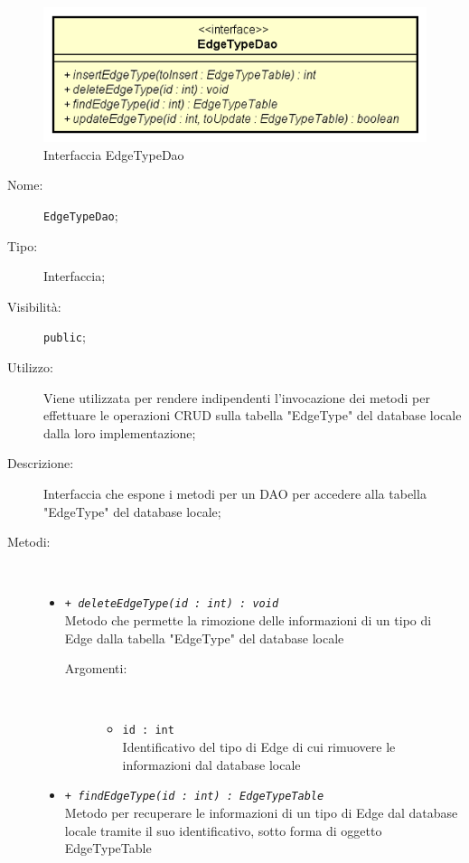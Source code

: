 \documentclass[../DefinizioneDiProdotto.tex]{subfiles}
\begin{document}
    \begin{figure}[H]
        \centering
        \includegraphics{img/EdgeTypeDao.png}
        \caption{Interfaccia EdgeTypeDao}\label{fig:model::dataaccess::dao::EdgeTypeDao} 
    \end{figure}
    \begin{description}
\item[Nome:] \texttt{EdgeTypeDao};
\item[Tipo:] Interfaccia;
\item[Visibilità:] \texttt{public};
\item[Utilizzo:] Viene utilizzata per rendere indipendenti l'invocazione dei metodi per effettuare le operazioni CRUD sulla tabella "EdgeType" del database locale dalla loro implementazione;
\item[Descrizione:] Interfaccia che espone i metodi per un DAO per accedere alla tabella "EdgeType" del database locale;
\item[Metodi:] \
\begin{itemize}
\item \texttt{+ \textit{deleteEdgeType(id : int) : void}}\\
Metodo che permette la rimozione delle informazioni di un tipo di Edge dalla tabella "EdgeType" del database locale
 \begin{description}
\item[Argomenti:] \
\begin{itemize}
\item \texttt{id : int}\\
Identificativo del tipo di Edge di cui rimuovere le informazioni dal database locale\end{itemize}
\end{description}
\item \texttt{+ \textit{findEdgeType(id : int) : EdgeTypeTable}}\\
Metodo per recuperare le informazioni di un tipo di Edge dal database locale tramite il suo identificativo, sotto forma di oggetto EdgeTypeTable
 \begin{description}

\end{description}
\end{itemize}
\end{description}
\end{document}
